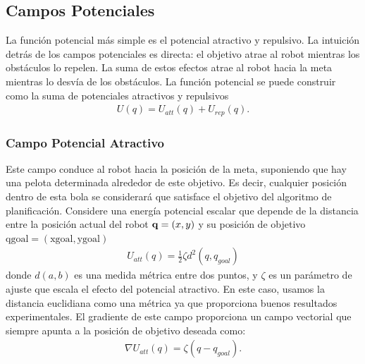 \subsection{Campos Potenciales}
La funci\'on potencial m\'as simple es el potencial atractivo y repulsivo. La intuici\'on detr\'as de los campos potenciales es directa: el objetivo atrae al robot mientras los obst\'aculos lo repelen. La suma de estos efectos atrae al robot hacia la meta mientras lo desvía de los obst\'aculos. La funci\'on potencial se puede construir como la suma de potenciales atractivos y repulsivos
\begin{align}
\label{eqn:potetialField}
U(q) = U_{att}(q) + U_{rep}(q).
\end{align}
\subsubsection{Campo Potencial Atractivo}
Este campo conduce al robot hacia la posici\'on de la meta, suponiendo que hay una pelota determinada alrededor de este objetivo. Es decir, cualquier posici\'on dentro de esta bola se considerar\'a que satisface el objetivo del algoritmo de planificaci\'on. Considere una energ\'ia potencial escalar que depende de la distancia entre la posici\'on actual del robot $\mathbf q=(x,y)$ y su posici\'on de objetivo $\text{qgoal}=(\text{xgoal},\text{ygoal})$
\begin{align}
\label{eqn:pot_attr}
U_{att}(q) = \frac{1}{2}\zeta d^{2} (q,q_{goal})
\end{align}
donde $d(a,b)$ es una medida m\'etrica entre dos puntos, y $\zeta$ es un par\'ametro de ajuste que escala el efecto del potencial atractivo. En este caso, usamos la distancia euclidiana como una m\'etrica ya que proporciona buenos resultados experimentales. El gradiente de este campo proporciona un campo vectorial que siempre apunta a la posici\'on de objetivo deseada como:
\begin{align}
\label{eqn:gradient_att}
\nabla U_{att}(q)=\zeta(q-q_{goal}).
\end{align}

